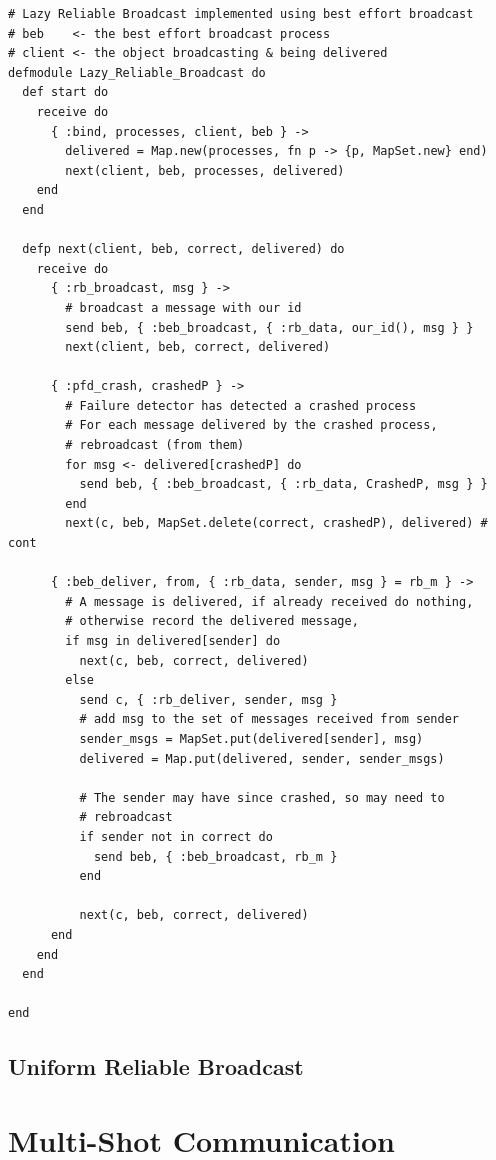 \begin{verbatim}
# Lazy Reliable Broadcast implemented using best effort broadcast
# beb    <- the best effort broadcast process
# client <- the object broadcasting & being delivered
defmodule Lazy_Reliable_Broadcast do
  def start do
    receive do
      { :bind, processes, client, beb } ->
        delivered = Map.new(processes, fn p -> {p, MapSet.new} end)
        next(client, beb, processes, delivered)
    end
  end

  defp next(client, beb, correct, delivered) do
    receive do
      { :rb_broadcast, msg } ->
        # broadcast a message with our id
        send beb, { :beb_broadcast, { :rb_data, our_id(), msg } }
        next(client, beb, correct, delivered)

      { :pfd_crash, crashedP } ->
        # Failure detector has detected a crashed process
        # For each message delivered by the crashed process,
        # rebroadcast (from them)
        for msg <- delivered[crashedP] do
          send beb, { :beb_broadcast, { :rb_data, CrashedP, msg } }
        end
        next(c, beb, MapSet.delete(correct, crashedP), delivered) # cont

      { :beb_deliver, from, { :rb_data, sender, msg } = rb_m } ->
        # A message is delivered, if already received do nothing,
        # otherwise record the delivered message,
        if msg in delivered[sender] do
          next(c, beb, correct, delivered)
        else
          send c, { :rb_deliver, sender, msg }
          # add msg to the set of messages received from sender
          sender_msgs = MapSet.put(delivered[sender], msg)
          delivered = Map.put(delivered, sender, sender_msgs)

          # The sender may have since crashed, so may need to
          # rebroadcast
          if sender not in correct do
            send beb, { :beb_broadcast, rb_m }
          end

          next(c, beb, correct, delivered)
      end
    end
  end

end
\end{verbatim}

\subsection{Uniform Reliable Broadcast}



\section{Multi-Shot Communication}

